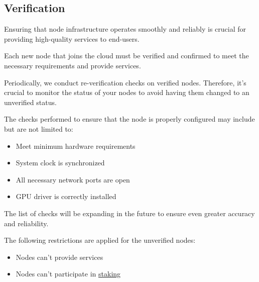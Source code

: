 \subsection{Verification}

Ensuring that node infrastructure operates smoothly and reliably is crucial for providing high-quality services to end-users.

Each new node that joins the cloud must be verified and confirmed to meet the necessary requirements and provide services.

Periodically, we conduct re-verification checks on verified nodes. Therefore, it's crucial to monitor the status of your nodes to avoid having them changed to an unverified status.

The checks performed to ensure that the node is properly configured may include but are not limited to:

\begin{itemize}
    \item Meet minimum hardware requirements
    \item System clock is synchronized
    \item All necessary network ports are open
    \item GPU driver is correctly installed
\end{itemize}

The list of checks will be expanding in the future to ensure even greater accuracy and reliability.

The following restrictions are applied for the unverified nodes:

\begin{itemize}
    \item Nodes can't provide services
    \item Nodes can't participate in \hyperref[sec:staking]{staking}
\end{itemize}
